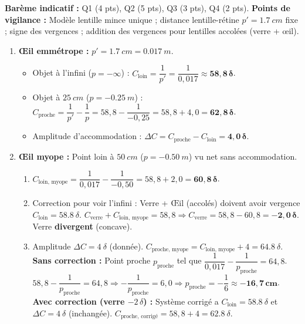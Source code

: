 \documentclass[11pt]{article}
\begin{document}
\begin{corrige}
\textbf{Barème indicatif :} Q1 (4 pts), Q2 (5 pts), Q3 (3 pts), Q4 (2 pts).
\textbf{Points de vigilance :} Modèle lentille mince unique ; distance lentille-rétine $p' = \SI{+1,7}{cm}$ fixe ; signe des vergences ; addition des vergences pour lentilles accolées (verre + œil).
\begin{enumerate}
    \item \textbf{Œil emmétrope :} $p' = \SI{+1,7}{cm} = \SI{0,017}{m}$.
    \begin{itemize}
        \item Objet à l'infini ($p=-\infty$) : $C_{\text{loin}} = \dfrac{1}{p'} = \dfrac{1}{0,017} \approx \mathbf{58,8\,\delta}$.
        \item Objet à $\SI{25}{cm}$ ($p=\SI{-0,25}{m}$) :
        $C_{\text{proche}} = \dfrac{1}{p'} - \dfrac{1}{p} = 58,8 - \dfrac{1}{-0,25} = 58,8 + 4,0 = \mathbf{62,8\,\delta}$.
        \item Amplitude d'accommodation : $\Delta C = C_{\text{proche}} - C_{\text{loin}} = \mathbf{4,0\,\delta}$.
    \end{itemize}
    \item \textbf{Œil myope :} Point loin à $\SI{50}{cm}$ ($p=\SI{-0,50}{m}$) vu net sans accommodation.
    \begin{enumerate}
        \item $C_{\text{loin, myope}} = \dfrac{1}{0,017} - \dfrac{1}{-0,50} = 58,8 + 2,0 = \mathbf{60,8\,\delta}$.
        \item Correction pour voir l'infini : Verre + Œil (accolés) doivent avoir vergence $C_{\text{loin}} = \SI{58,8}{\delta}$.
        $C_{\text{verre}} + C_{\text{loin, myope}} = 58,8 \Rightarrow C_{\text{verre}} = 58,8 - 60,8 = \mathbf{-2,0\,\delta}$.
        Verre \textbf{divergent} (concave).
        \item Amplitude $\Delta C = \SI{4}{\delta}$ (donnée). $C_{\text{proche, myope}} = C_{\text{loin, myope}} + 4 = \SI{64,8}{\delta}$.
        \textbf{Sans correction :} Point proche $p_{\text{proche}}$ tel que $\dfrac{1}{0,017} - \dfrac{1}{p_{\text{proche}}} = 64,8$.
        $58,8 - \dfrac{1}{p_{\text{proche}}} = 64,8 \Rightarrow -\dfrac{1}{p_{\text{proche}}} = 6,0 \Rightarrow p_{\text{proche}} = -\dfrac{1}{6} \approx \mathbf{-16,7\,cm}$.
        \textbf{Avec correction (verre $-2\,\delta$) :} Système corrigé a $C_{\text{loin}}=\SI{58,8}{\delta}$ et $\Delta C = \SI{4}{\delta}$ (inchangée).
        $C_{\text{proche, corrigé}} = 58,8 + 4 = \SI{62,8}{\delta}$.

\end{enumerate}
\end{enumerate}
\end{corrige}
\end{document}
